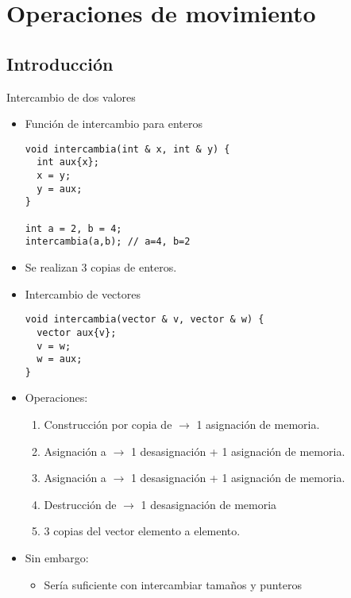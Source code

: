 \section{Operaciones de movimiento}

\subsection{Introducción}

\begin{frame}[fragile]{Intercambio de dos valores}
\begin{itemize}
  \item Función de intercambio para enteros
\begin{lstlisting}
void intercambia(int & x, int & y) {
  int aux{x};
  x = y;
  y = aux;
}

int a = 2, b = 4;
intercambia(a,b); // a=4, b=2
\end{lstlisting}
  \item Se realizan 3 copias de enteros.
\end{itemize}
\end{frame}

\begin{frame}[fragile]
\begin{itemize}
  \item Intercambio de vectores
\begin{lstlisting}
void intercambia(vector & v, vector & w) {
  vector aux{v};
  v = w;
  w = aux;
}
\end{lstlisting}
  \item Operaciones:
    \begin{enumerate}
      \item Construcción por copia de  $\rightarrow$ 1 asignación de memoria.
      \item Asignación a  $\rightarrow$ 1 desasignación + 1 asignación de memoria.
      \item Asignación a  $\rightarrow$ 1 desasignación + 1 asignación de memoria.
      \item Destrucción de  $\rightarrow$ 1 desasignación de memoria
      \item 3 copias del vector elemento a elemento.
    \end{enumerate}
  \item Sin embargo:
    \begin{itemize}
      \item Sería suficiente con intercambiar tamaños y punteros
    \end{itemize}
\end{itemize}
\end{frame}

